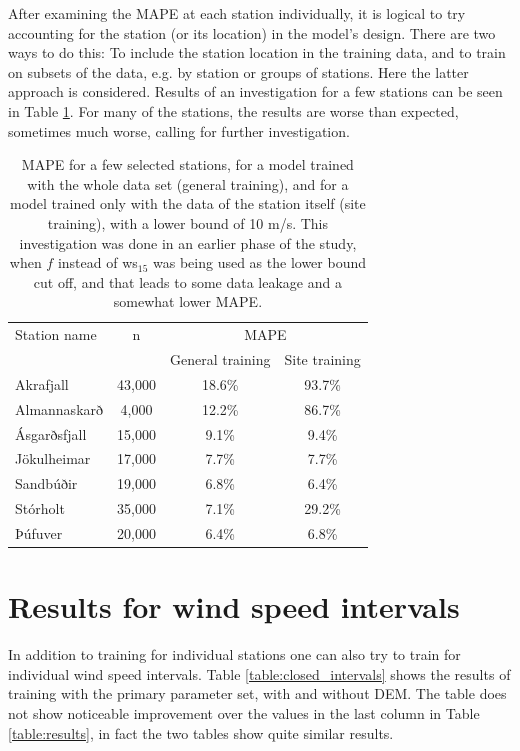 After examining the MAPE at each station individually, it is logical to try accounting for the station (or its location) in the model’s design. There are two ways to do this: To include the station location in the training data, and to train on subsets of the data, e.g. by station or groups of stations. Here the latter approach is considered. Results of an investigation for a few stations can be seen in Table \ref{table:specific_sites}. For many of the stations, the results are worse than expected, sometimes much worse, calling for further investigation.

\begin{table}[h]
  \caption[Model result by station]{MAPE for a few selected stations, for a model trained with the whole data set (general training), and for a model trained only with the data of the station itself (site training), with a lower bound of 10 m/s. This investigation was done in an earlier phase of the study, when $f$ instead of ws$_{15}$ was being used as the lower bound cut off, and that leads to some data leakage and a somewhat lower MAPE.}
    \label{table:specific_sites}
    \centering
    \begin{tabular}{lccc}
        \toprule
        Station name & n & \multicolumn{2}{c}{MAPE}\\
        & & General training & Site training\\
        \midrule
        Akrafjall & 43,000 & 18.6\% & 93.7\%\\
        Almannaskarð & 4,000 & 12.2\% & 86.7\%\\
        Ásgarðsfjall & 15,000 & 9.1\% & 9.4\%\\
        Jökulheimar & 17,000 & 7.7\% & 7.7\%\\
        Sandbúðir & 19,000 & 6.8\% & 6.4\%\\
        Stórholt & 35,000 & 7.1\% & 29.2\% \\
        Þúfuver & 20,000 & 6.4\% & 6.8\%\\
        \bottomrule
    \end{tabular}
\end{table}

\section{Results for wind speed intervals}
In addition to training for individual stations one can also try to train for individual wind speed intervals. Table \ref{table:closed_intervals} shows the results of training with the primary parameter set, with and without DEM. The table does not show noticeable improvement over the values in the last column in Table \ref{table:results}, in fact the two tables show quite similar results.

